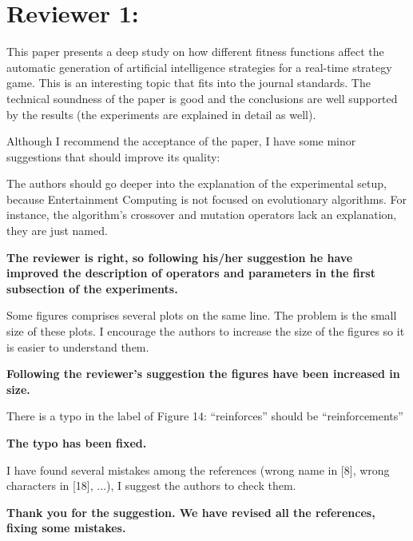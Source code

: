 \documentclass{article}
\begin{document}
\section{Reviewer 1:}

This paper presents a deep study on how different fitness functions affect the automatic generation of artificial intelligence strategies for a real-time strategy game. This is an interesting topic that fits into the journal standards. The technical soundness of the paper is good and the conclusions are well supported by the results (the experiments are explained in detail as well).

Although I recommend the acceptance of the paper, I have some minor suggestions that should improve its quality:

The authors should go deeper into the explanation of the experimental setup, because Entertainment Computing is not focused on evolutionary algorithms. For instance, the algorithm's crossover and mutation operators lack an explanation, they are just named.

\vspace{0.5cm} \textbf{The reviewer is right, so following his/her suggestion he have improved the description of operators and parameters in the first subsection of the experiments.} \vspace{0.5cm}

Some figures comprises several plots on the same line. The problem is the small size of these plots. I encourage the authors to increase the size of the figures so it is easier to understand them.

\vspace{0.5cm} \textbf{Following the reviewer's suggestion the figures have been increased in size.} \vspace{0.5cm}

There is a typo in the label of Figure 14: ``reinforces'' should be ``reinforcements''

\vspace{0.5cm} \textbf{The typo has been fixed.} \vspace{0.5cm}

I have found several mistakes among the references (wrong name in [8], wrong characters in [18], ...), I suggest the authors to check them.

\vspace{0.5cm} \textbf{Thank you for the suggestion. We have revised all the references, fixing some mistakes.} \vspace{0.5cm}
\end{document}

